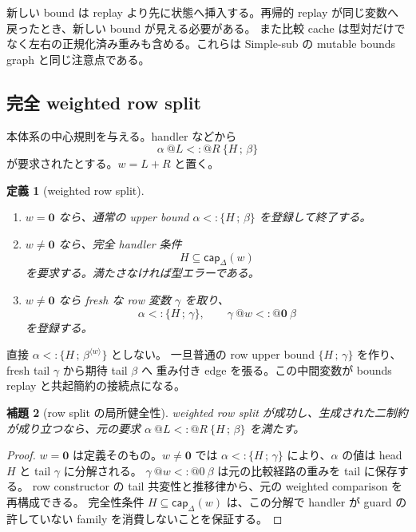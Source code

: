 \documentclass[uplatex,dvipdfmx,a4paper,11pt]{jsarticle}
\makeatletter
\theoremstyle{jpplain}
\newtheorem{definition}{定義}[section]
\newtheorem{lemma}[definition]{補題}
\newcommand{\subty}{\mathrel{<:}}
\newcommand{\row}[2]{\{#1\,;\,#2\}}
\newcommand{\zeroW}{\mathbf 0}
\newcommand{\capW}[2]{\mathsf{cap}_{#1}(#2)}
\newcommand{\wocc}[2]{#1^{\langle #2\rangle}}
\newcommand{\wsub}[4]{#1\ @#2\mathrel{<:}@#3\ #4}
\makeatother
\begin{document}
\begin{formalbox}[title={変数ケースの実装的不変条件},fonttitle=\bfseries]
新しい bound は replay より先に状態へ挿入する。再帰的 replay が同じ変数へ戻ったとき、新しい bound が見える必要がある。
また比較 cache は型対だけでなく左右の正規化済み重みも含める。これらは Simple-sub の mutable bounds graph と同じ注意点である。
\end{formalbox}

\subsection{完全 weighted row split}

本体系の中心規則を与える。handler などから
\[
  \wsub{\alpha}{L}{R}{\row H\beta}
\]
が要求されたとする。$w=L+R$ と置く。

\begin{definition}[weighted row split]
\begin{enumerate}
  \item \(w=\zeroW\) なら、通常の upper bound
  $\alpha\subty\row H\beta$ を登録して終了する。
  \item \(w\neq\zeroW\) なら、完全 handler 条件
  \[
    H\subseteq\capW\Delta w
  \]
  を要求する。満たさなければ型エラーである。
  \item \(w\neq\zeroW\) なら fresh な row 変数 $\gamma$ を取り、
  \[
    \alpha\subty\row H\gamma,
    \qquad
    \wsub{\gamma}{w}{\zeroW}{\beta}
  \]
  を登録する。
\end{enumerate}
\end{definition}

\begin{readingbox}
直接 $\alpha\subty\row H{\wocc\beta w}$ としない。
一旦普通の row upper bound $\row H\gamma$ を作り、fresh tail $\gamma$ から期待 tail $\beta$ へ
重み付き edge を張る。この中間変数が bounds replay と共起簡約の接続点になる。
\end{readingbox}

\begin{lemma}[row split の局所健全性]
weighted row split が成功し、生成された二制約が成り立つなら、元の要求
$\wsub{\alpha}{L}{R}{\row H\beta}$ を満たす。
\end{lemma}
\begin{proof}
\(w=\zeroW\) は定義そのもの。\(w\neq\zeroW\) では
$\alpha\subty\row H\gamma$ により、$\alpha$ の値は head $H$ と tail $\gamma$ に分解される。
$\wsub{\gamma}{w}{0}{\beta}$ は元の比較経路の重みを tail に保存する。
row constructor の tail 共変性と推移律から、元の weighted comparison を再構成できる。
完全性条件 $H\subseteq\capW\Delta w$ は、この分解で handler が guard の許していない family を消費しないことを保証する。
\end{proof}
\end{document}

